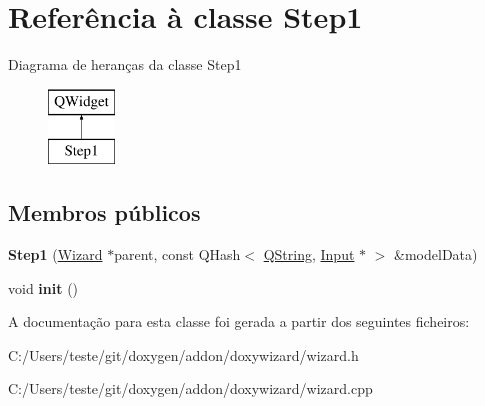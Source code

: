 \hypertarget{class_step1}{\section{Referência à classe Step1}
\label{class_step1}
}
Diagrama de heranças da classe Step1\begin{figure}[H]
\begin{center}
\leavevmode
\includegraphics[height=2.000000cm]{class_step1}
\end{center}
\end{figure}
\subsection*{Membros públicos}
\begin{DoxyCompactItemize}
\item 
\hypertarget{class_step1_a8eef39d6af269c9f827594a67ba53a45}{{\bfseries Step1} (\hyperlink{class_wizard}{Wizard} $\ast$parent, const Q\-Hash$<$ \hyperlink{class_q_string}{Q\-String}, \hyperlink{class_input}{Input} $\ast$ $>$ \&model\-Data)}\label{class_step1_a8eef39d6af269c9f827594a67ba53a45}

\item 
\hypertarget{class_step1_a02fd73d861ef2e4aabb38c0c9ff82947}{void {\bfseries init} ()}\label{class_step1_a02fd73d861ef2e4aabb38c0c9ff82947}

\end{DoxyCompactItemize}


A documentação para esta classe foi gerada a partir dos seguintes ficheiros\-:\begin{DoxyCompactItemize}
\item 
C\-:/\-Users/teste/git/doxygen/addon/doxywizard/wizard.\-h\item 
C\-:/\-Users/teste/git/doxygen/addon/doxywizard/wizard.\-cpp\end{DoxyCompactItemize}

